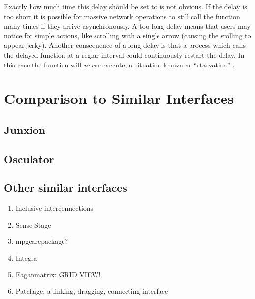 Exactly how much time this delay should be set to is not obvious. If the delay is too short it is possible for massive network operations to still call the function many times if they arrive asynchronously. A too-long delay means that users may notice for simple actions, like scrolling with a single arrow (causing the srolling to appear jerky). Another consequence of a long delay is that a process which calls the delayed function at a reglar interval could continuously restart the delay. In this case the function will \emph{never} execute, a situation known as ``starvation'' .

	



\section{Comparison to Similar Interfaces} %
\label{sec:comparison_to_similar_interfaces}

	\subsection{Junxion} %
	\label{sub:junxion}
		\cite{junxion}

	\subsection{Osculator} %
	\label{sub:osculator}
		\cite{osculator}

	\subsection{Other similar interfaces} %
	\label{sub:other_similar_interfaces}
	
	\begin{enumerate}
		\item Inclusive interconnections 
		\item Sense Stage 
		\item mpgcarepackage?
		\item Integra 
		\item Eaganmatrix: GRID VIEW! 
		\item Patchage: a linking, dragging, connecting interface 
	\end{enumerate}

